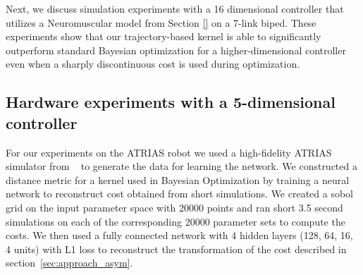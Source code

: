 Next, we discuss simulation experiments with a 16 dimensional controller that utilizes a Neuromuscular model from Section \ref{} on a 7-link biped. These experiments show that our trajectory-based kernel is able to significantly outperform standard Bayesian optimization for a higher-dimensional controller even when a sharply discontinuous cost is used during optimization.

\subsection{Hardware experiments with a 5-dimensional controller}
\label{experiments_atrias}

For our experiments on the ATRIAS robot we used a high-fidelity ATRIAS simulator from ~\cite{martin2015robust} to generate the data for learning the network. 
We constructed a distance metric for a kernel used in Bayesian Optimization by training a neural network to reconstruct cost obtained from short simulations. We created a sobol grid on the input parameter space with 20000 points and ran short 3.5 second simulations on each of the corresponding 20000 parameter sets to compute the costs. We then used a fully connected network with 4 hidden layers (128, 64, 16, 4 units) with L1 loss to reconstruct the transformation of the cost described in section~\ref{sec:approach_asym}.



